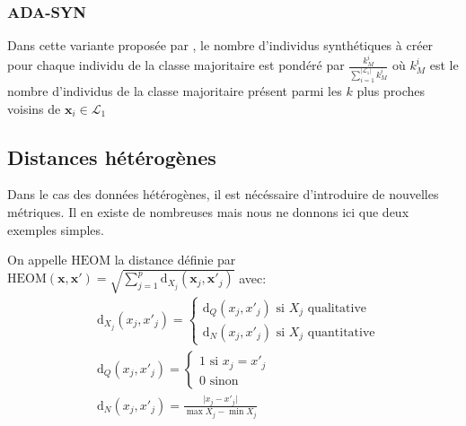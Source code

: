 \subsubsection{ADA-SYN}

Dans cette variante proposée par \citet{He2008}, le nombre d'individus synthétiques à créer pour chaque individu de la classe majoritaire est pondéré par $\frac{k_M^i}{\sum_{i=1}^{\vert \mathcal{L}_1 \vert} k_M^i}$ où $k_M^i$ est le nombre d'individus de la classe majoritaire présent parmi les $k$ plus proches voisins de $\mathbf{x}_i \in \mathcal{L}_1$

\subsection{Distances hétérogènes}

Dans le cas des données hétérogènes, il est nécéssaire d'introduire de nouvelles métriques. Il en existe de nombreuses \citep{Wilson1997,Lumijarvi2004,Rodriguez2008} mais nous ne donnons ici que deux exemples simples.

\begin{definition}
    On appelle $\mathrm{HEOM}$ la distance définie par $\mathrm{HEOM} (\mathbf{x},\mathbf{x}') = \sqrt{ \sum_{j=1}^p \mathrm{d}_{X_j} (\mathbf{x}_j,\mathbf{x}'_j) }$ avec:
    \begin{align*}
        &\mathrm{d}_{X_j} (x_j,x'_j) = \begin{cases}
            \mathrm{d}_Q (x_j,x'_j) \text{ si } X_j \text{ qualitative} \\
            \mathrm{d}_N (x_j,x'_j) \text{ si } X_j \text{ quantitative}
        \end{cases} \\
        &\mathrm{d}_Q (x_j,x'_j) = \begin{cases}
            1 \text{ si } x_j = x'_j \\
            0 \text{ sinon}
        \end{cases}\\
        &\mathrm{d}_N (x_j,x'_j) = \frac{\vert x_j - x'_j \vert}{\max X_j - \min X_j}
    \end{align*}
\end{definition}

